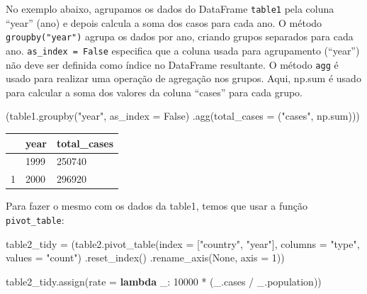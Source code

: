 \documentclass[
  portuguese,
  letterpaper,
  DIV=11,
  numbers=noendperiod]{scrreprt}
\newenvironment{Shaded}{\begin{snugshade}}{\end{snugshade}}
\newcommand{\BuiltInTok}[1]{\textcolor[rgb]{0.00,0.23,0.31}{#1}}
\newcommand{\DecValTok}[1]{\textcolor[rgb]{0.68,0.00,0.00}{#1}}
\newcommand{\KeywordTok}[1]{\textcolor[rgb]{0.00,0.23,0.31}{\textbf{#1}}}
\newcommand{\NormalTok}[1]{\textcolor[rgb]{0.00,0.23,0.31}{#1}}
\newcommand{\OperatorTok}[1]{\textcolor[rgb]{0.37,0.37,0.37}{#1}}
\newcommand{\StringTok}[1]{\textcolor[rgb]{0.13,0.47,0.30}{#1}}
\newcommand{\VariableTok}[1]{\textcolor[rgb]{0.07,0.07,0.07}{#1}}
\theoremstyle{definition}
\theoremstyle{remark}
\begin{document}
No exemplo abaixo, agrupamos os dados do DataFrame \texttt{table1} pela
coluna ``year'' (ano) e depois calcula a soma dos casos para cada ano. O
método \texttt{groupby("year")} agrupa os dados por ano, criando grupos
separados para cada ano. \texttt{as\_index\ =\ False} especifica que a
coluna usada para agrupamento (``year'') não deve ser definida como
índice no DataFrame resultante. O método \texttt{agg} é usado para
realizar uma operação de agregação nos grupos. Aqui, np.sum é usado para
calcular a soma dos valores da coluna ``cases'' para cada grupo.

\begin{Shaded}
\begin{Highlighting}[]
\NormalTok{(table1.groupby(}\StringTok{"year"}\NormalTok{, as\_index }\OperatorTok{=} \VariableTok{False}\NormalTok{)}
\NormalTok{       .agg(total\_cases }\OperatorTok{=}\NormalTok{ (}\StringTok{"cases"}\NormalTok{, np.}\BuiltInTok{sum}\NormalTok{)))}
\end{Highlighting}
\end{Shaded}

\begin{longtable}[]{@{}lll@{}}
\toprule\noalign{}
& year & total\_cases \\
\midrule\noalign{}
\endhead
\bottomrule\noalign{}
\endlastfoot
0 & 1999 & 250740 \\
1 & 2000 & 296920 \\
\end{longtable}

Para fazer o mesmo com os dados da table1, temos que usar a função
\texttt{pivot\_table}:

\begin{Shaded}
\begin{Highlighting}[]
\NormalTok{table2\_tidy }\OperatorTok{=}\NormalTok{ (table2.pivot\_table(index }\OperatorTok{=}\NormalTok{ [}\StringTok{"country"}\NormalTok{, }\StringTok{"year"}\NormalTok{], columns }\OperatorTok{=} \StringTok{"type"}\NormalTok{, values }\OperatorTok{=} \StringTok{"count"}\NormalTok{)}
\NormalTok{               .reset\_index()}
\NormalTok{               .rename\_axis(}\VariableTok{None}\NormalTok{, axis }\OperatorTok{=} \DecValTok{1}\NormalTok{))}

\NormalTok{table2\_tidy.assign(rate }\OperatorTok{=} \KeywordTok{lambda}\NormalTok{ \_: }\DecValTok{10000} \OperatorTok{*}\NormalTok{ (\_.cases }\OperatorTok{/}\NormalTok{ \_.population))}
\end{Highlighting}
\end{Shaded}
\end{document}
